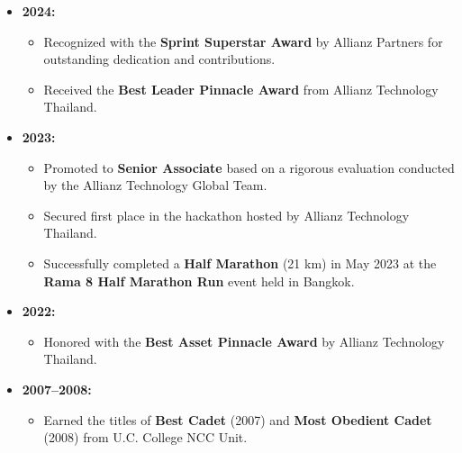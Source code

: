 \documentclass[10pt, letterpaper]{article}
\begin{document}
\begin{itemize}
    \item \textbf{2024:} 
        \begin{itemize}
            \item Recognized with the \textbf{Sprint Superstar Award} by Allianz Partners for outstanding dedication and contributions.
            \item Received the \textbf{Best Leader Pinnacle Award} from Allianz Technology Thailand.
        \end{itemize}
    \item \textbf{2023:}
        \begin{itemize}
            \item Promoted to \textbf{Senior Associate} based on a rigorous evaluation conducted by the Allianz Technology Global Team.
            \item Secured first place in the hackathon hosted by Allianz Technology Thailand.
            \item Successfully completed a \textbf{Half Marathon} (21 km) in May 2023 at the \textbf{Rama 8 Half Marathon Run} event held in Bangkok.
        \end{itemize}
    \item \textbf{2022:}
        \begin{itemize}
            \item Honored with the \textbf{Best Asset Pinnacle Award} by Allianz Technology Thailand.
        \end{itemize}
    \item \textbf{2007--2008:}
        \begin{itemize}
            \item Earned the titles of \textbf{Best Cadet} (2007) and \textbf{Most Obedient Cadet} (2008) from U.C. College NCC Unit.
        \end{itemize}
\end{itemize}
\end{document}
